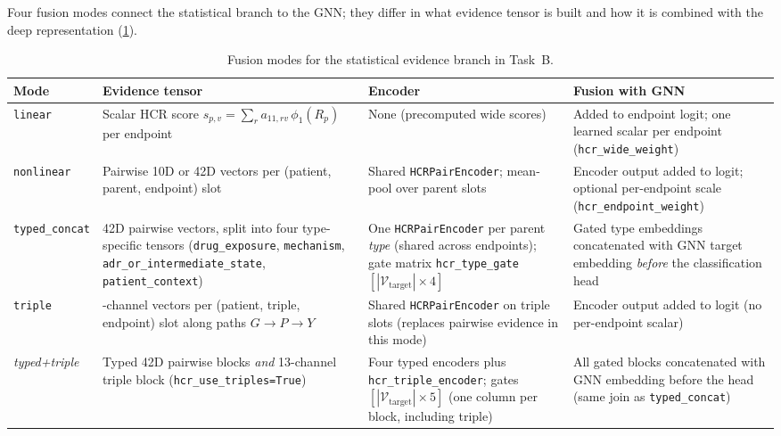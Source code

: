 Four fusion modes connect the statistical branch to the GNN; they differ in
what evidence tensor is built and how it is combined with the deep
representation (\cref{tab:fusion_modes}).

\begin{table}[H]
  \centering
  \scriptsize
  \setlength{\tabcolsep}{4pt}
  \renewcommand{\arraystretch}{1.15}
  \caption{Fusion modes for the statistical evidence branch in Task~B.}
  \label{tab:fusion_modes}
  \begin{tabular}{@{}>{\raggedright\arraybackslash}p{}
                       >{\raggedright\arraybackslash}p{}
                       >{\raggedright\arraybackslash}p{}
                       >{\raggedright\arraybackslash}p{}@{}}
    \toprule
    \textbf{Mode} & \textbf{Evidence tensor} & \textbf{Encoder} & \textbf{Fusion with GNN} \\
    \midrule
    \texttt{linear}
      & Scalar HCR score
        \(s_{p,v}=\sum_r a_{11,rv}\,\phi_1(R_p)\) per endpoint
      & None (precomputed wide scores)
      & Added to endpoint logit;
        one learned scalar per endpoint
        (\texttt{hcr\_wide\_weight}) \\
    \texttt{nonlinear}
      & Pairwise 10D or 42D vectors per
        (patient, parent, endpoint) slot
      & Shared \texttt{HCRPairEncoder};
        mean-pool over parent slots
      & Encoder output added to logit;
        optional per-endpoint scale
        (\texttt{hcr\_endpoint\_weight}) \\
    \texttt{typed\_concat}
      & 42D pairwise vectors, split into four
        type-specific tensors (\texttt{drug\_exposure},
        \texttt{mechanism},
        \texttt{adr\_or\_intermediate\_state},
        \texttt{patient\_context})
      & One \texttt{HCRPairEncoder} per parent
        \emph{type} (shared across endpoints);
        gate matrix \texttt{hcr\_type\_gate}
        $[|\mathcal{V}_{\text{target}}| \times 4]$
      & Gated type embeddings concatenated with
        GNN target embedding \emph{before}
        the classification head \\
    \texttt{triple}
      & 13-channel vectors per
        (patient, triple, endpoint) slot
        along paths \(G \rightarrow P \rightarrow Y\)
      & Shared \texttt{HCRPairEncoder} on
        triple slots (replaces pairwise
        evidence in this mode)
      & Encoder output added to logit
        (no per-endpoint scalar) \\
    \emph{typed+triple}
      & Typed 42D pairwise blocks \emph{and}
        13-channel triple block
        (\texttt{hcr\_use\_triples=True})
      & Four typed encoders plus
        \texttt{hcr\_triple\_encoder}; gates
        $[|\mathcal{V}_{\text{target}}| \times 5]$ (one column
        per block, including triple)
      & All gated blocks concatenated with GNN
        embedding before the head
        (same join as \texttt{typed\_concat}) \\
    \bottomrule
  \end{tabular}
\end{table}
\FloatBarrier

